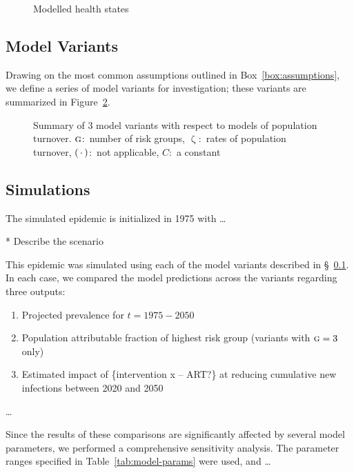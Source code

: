 \documentclass{article}
\numberwithin{equation}{section}
\renewcommand{\zeta}{\upzeta}
\newcommand{\G}{\textsc{g}}
\begin{document}
\begin{figure}
  \centering
  \caption{Modelled health states}\label{fig:health-states}
\end{figure}
\subsection{Model Variants}\label{ss:model-variants}
Drawing on the most common assumptions outlined in Box~\ref{box:assumptions},
we define a series of model variants for investigation;
these variants are summarized in Figure~\ref{fig:variant-tree}.
\begin{figure}
  \centering
  \caption{Summary of 3 model variants with respect to models of population turnover.
    $\G$:~number of risk groups,
    $\zeta$:~rates of population turnover,
    $(\thinspace\cdot\thinspace)$:~not applicable,
    $C$:~a constant}
  \label{fig:variant-tree}
\end{figure}
\subsection{Simulations}
The simulated epidemic is initialized in 1975 with \dots

* Describe the scenario
\par
This epidemic was simulated
using each of the model variants described in \S~\ref{ss:model-variants}.
In each case, we compared the model predictions across the variants
regarding three outputs:
\begin{enumerate}
  \item Projected prevalence for $t = 1975 - 2050$
  \item Population attributable fraction of highest risk group (variants with $\G = 3$ only)
  \item Estimated impact of \{intervention x -- ART?\} at reducing cumulative new infections between 2020 and 2050
\end{enumerate}
\dots
\par
Since the results of these comparisons are significantly affected by several model parameters,
we performed a comprehensive sensitivity analysis.
The parameter ranges specified in Table~\ref{tab:model-params} were used,
and \dots
\end{document}
